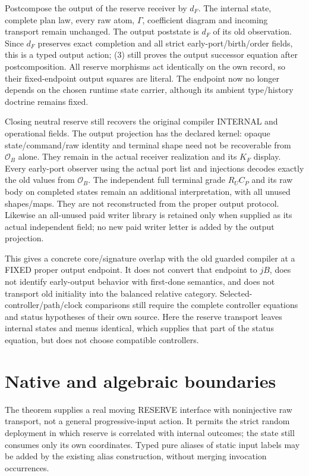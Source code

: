 \documentclass[11pt]{article}
\begin{document}
Postcompose the output of the reserve receiver by $d_F$. The internal state, complete plan law, every raw atom, $\Gamma$, coefficient diagram and incoming transport remain unchanged. The output poststate is $d_F$ of its old observation. Since $d_F$ preserves exact completion and all strict early-port/birth/order fields, this is a typed output action; (3) still proves the output successor equation after postcomposition. All reserve morphisms act identically on the own record, so their fixed-endpoint output squares are literal. The endpoint now no longer depends on the chosen runtime state carrier, although its ambient type/history doctrine remains fixed.

Closing neutral reserve still recovers the original compiler INTERNAL and operational fields. The output projection has the declared kernel: opaque state/command/raw identity and terminal shape need not be recoverable from $\mathcal O_B$ alone. They remain in the actual receiver realization and its $K_F$ display. Every early-port observer using the actual port list and injections decodes exactly the old values from $\mathcal O_B$. The independent full terminal grade $R_U C_P$ and its raw body on completed states remain an additional interpretation, with all unused shapes/maps. They are not reconstructed from the proper output protocol. Likewise an all-unused paid writer library is retained only when supplied as its actual independent field; no new paid writer letter is added by the output projection.

This gives a concrete core/signature overlap with the old guarded compiler at a FIXED proper output endpoint. It does not convert that endpoint to $jB$, does not identify early-output behavior with first-done semantics, and does not transport old initiality into the balanced relative category. Selected-controller/path/clock comparisons still require the complete controller equations and status hypotheses of their own source. Here the reserve transport leaves internal states and menus identical, which supplies that part of the status equation, but does not choose compatible controllers.

\section{Native and algebraic boundaries}
The theorem supplies a real moving RESERVE interface with noninjective raw transport, not a general progressive-input action. It permits the strict random deployment in which reserve is correlated with internal outcomes; the state still consumes only its own coordinates. Typed pure aliases of static input labels may be added by the existing alias construction, without merging invocation occurrences.
\end{document}
